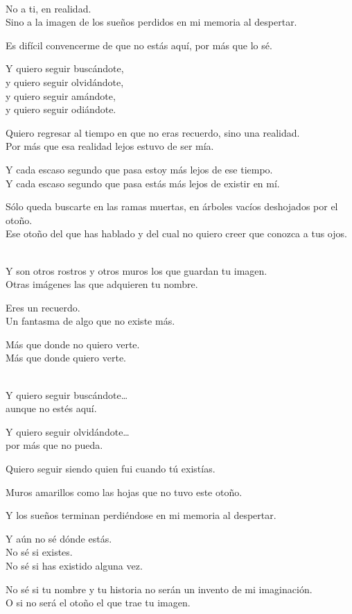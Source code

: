 \begin{lyrics}
\\
No a ti, en realidad.\\
Sino a la imagen de los sueños perdidos en mi memoria al despertar.

Es difícil convencerme de que no estás aquí, por más que lo sé.

Y quiero seguir buscándote,\\
y quiero seguir olvidándote,\\
y quiero seguir amándote,\\
y quiero seguir odiándote.

Quiero regresar al tiempo en que no eras recuerdo, sino una realidad.\\
Por más que esa realidad lejos estuvo de ser mía.

Y cada escaso segundo que pasa estoy más lejos de ese tiempo.\\
Y cada escaso segundo que pasa estás más lejos de existir en mí.

Sólo queda buscarte en las ramas muertas, en árboles vacíos deshojados por el otoño.\\
Ese otoño del que has hablado y del cual no quiero creer que conozca a tus ojos.

\\
Y son otros rostros y otros muros los que guardan tu imagen.\\
Otras imágenes las que adquieren tu nombre.

Eres un recuerdo.\\
Un fantasma de algo que no existe más.

Más que donde no quiero verte.\\
Más que donde quiero verte.

\\
Y quiero seguir buscándote…\\
aunque no estés aquí.

Y quiero seguir olvidándote…\\
por más que no pueda.

Quiero seguir siendo quien fui cuando tú existías.

Muros amarillos como las hojas que no tuvo este otoño.

Y los sueños terminan perdiéndose en mi memoria al despertar.

Y aún no sé dónde estás.\\
No sé si existes.\\
No sé si has existido alguna vez.

No sé si tu nombre y tu historia no serán un invento de mi imaginación.\\
O si no será el otoño el que trae tu imagen.

\end{lyrics}

